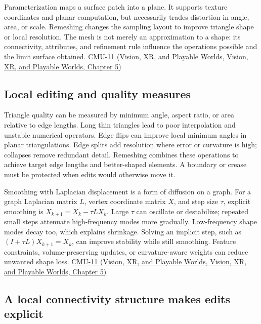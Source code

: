 Parameterization maps a surface patch into a plane. It supports texture coordinates and planar computation, but necessarily trades distortion in angle, area, or scale. Remeshing changes the sampling layout to improve triangle shape or local resolution. The mesh is not merely an approximation to a shape: its connectivity, attributes, and refinement rule influence the operations possible and the limit surface obtained. \href{../07-Vision-XR-and-Playable-Worlds/main.pdf\#nameddest=04-visual-computing-ii-ch036-cmu-11---digital-geometry-processing}{CMU-11 (Vision, XR, and Playable Worlds, Vision, XR, and Playable Worlds, Chapter 5)}

\subsection{Local editing and quality measures}\label{03-visual-computing-i-ch002-local-editing-and-quality-measures}

Triangle quality can be measured by minimum angle, aspect ratio, or area relative to edge lengths. Long thin triangles lead to poor interpolation and unstable numerical operators. Edge flips can improve local minimum angles in planar triangulations. Edge splits add resolution where error or curvature is high; collapses remove redundant detail. Remeshing combines these operations to achieve target edge lengths and better-shaped elements. A boundary or crease must be protected when edits would otherwise move it.

Smoothing with Laplacian displacement is a form of diffusion on a graph. For a graph Laplacian matrix \(L\), vertex coordinate matrix \(X\), and step size \(\tau\), explicit smoothing is \(X_{k+1}=X_k-\tau LX_k\). Large \(\tau\) can oscillate or destabilize; repeated small steps attenuate high-frequency modes more gradually. Low-frequency shape modes decay too, which explains shrinkage. Solving an implicit step, such as \((I+\tau L)X_{k+1}=X_k\), can improve stability while still smoothing. Feature constraints, volume-preserving updates, or curvature-aware weights can reduce unwanted shape loss. \href{../07-Vision-XR-and-Playable-Worlds/main.pdf\#nameddest=04-visual-computing-ii-ch036-cmu-11---digital-geometry-processing}{CMU-11 (Vision, XR, and Playable Worlds, Vision, XR, and Playable Worlds, Chapter 5)}

\subsection{A local connectivity structure makes edits explicit}\label{03-visual-computing-i-ch002-a-local-connectivity-structure-makes-edits-explicit}

